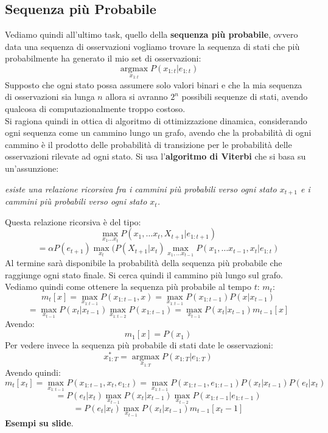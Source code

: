 \documentclass[a4paper,12pt, oneside]{book}
\begin{document}
\subsection{Sequenza più Probabile}
Vediamo quindi all'ultimo task, quello della \textbf{sequenza più probabile},
ovvero data una sequenza di osservazioni vogliamo trovare la sequenza di stati
che più probabilmente ha generato il mio set di osservazioni:
\[\operatorname*{argmax}_{x_{1:t}}P(x_{1:t}|e_{1:t})\]
Supposto che ogni stato possa assumere solo valori binari e che la mia
sequenza di osservazioni sia lunga $n$ allora si avranno $2^n$ possibili
sequenze di stati, avendo qualcosa di computazionalmente troppo costoso.\\
Si ragiona quindi in ottica di algoritmo di ottimizzazione dinamica,
considerando ogni sequenza come un cammino lungo un grafo, avendo che la
probabilità di ogni cammino è il prodotto delle probabilità di transizione per
le probabilità delle osservazioni rilevate ad ogni stato. Si usa
l'\textbf{algoritmo di Viterbi} che si basa su un'assunzione:
\begin{center}
  \textit{esiste una relazione ricorsiva fra i cammini più probabili verso ogni
    stato $x_{t+1}$ e i cammini più probabili verso ogni stato $x_t$.}
\end{center}
Questa relazione ricorsiva è del tipo:
\[\max_{x_1\ldots x_t}P(x_1,\ldots x_t,X_{t+1}|e_{1:t+1})\]\[=\alpha
  P(e_{t+1})\max_{x_t}(P(X_{t+1}|x_t)\max_{x_1,\ldots x_{t-1}}P(x_1,\ldots
x_{t-1},x_t|e_{1:t})\]
Al termine sarà disponibile la probabilità della sequenza più probabile che
raggiunge ogni stato finale. Si cerca quindi il cammino più lungo sul grafo.\\
Vediamo quindi come ottenere la sequenza più probabile al tempo $t$: $m_t$:
\[m_t[x]=\max_{x_{1:t-1}}P(x_{1:t-1},x)=\max_{x_{1:t-1}}P(x_{1:t-1})P(x|x_{t-1})\]
\[=\max_{x_{t-1}}P(x_t|x_{t-1})\max_{x_{1:t-2}}P(x_{1:t-1})=
  \max_{x_{t-1}}P(x_t|x_{t-1})m_{t-1}[x]\]
Avendo:
\[m_1[x]=P(x_1)\]
Per vedere invece la sequenza più probabile di stati date le osservazioni:
\[x_{1:T}^*=\operatorname*{argmax}_{x_{1:T}}P(x_{1:T}|e_{1:T})\]
Avendo quindi:
\[m_t[x_t]=\max_{x_{1:t-1}}P(x_{1:t-1},x_t,e_{1:t})=
\max_{x_{1:t-1}}P(x_{1:t-1},e_{1:t-1})P(x_t|x_{t-1})P(e_t|x_t)\]
\[=P(e_t|x_t)\max_{x_{t-1}}P(x_t|x_{t-1})\max_{x_{t-2}}P(x_{1:t-1}|e_{1:t-1})\]
\[=P(e_t|x_t)\max_{x_{t-1}}P(x_t|x_{t-1})m_{t-1}[x_t-1]\]
\textbf{Esempi su slide}.
\end{document}
